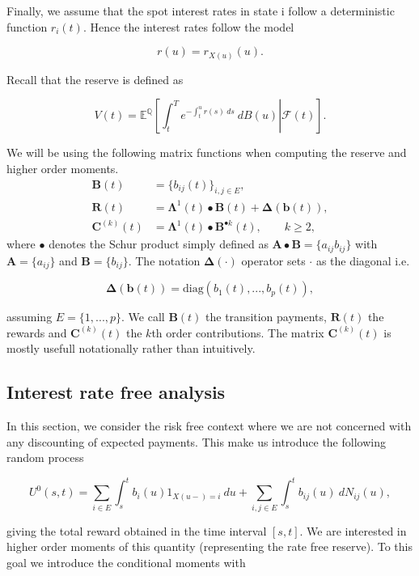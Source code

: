 \documentclass[a4paper,12pt,openany]{book}
\begin{document}
Finally, we assume that the spot interest rates in state i follow a deterministic function \(r_i(t)\). Hence the interest rates follow the model

\[
r(u) = r_{X(u)}(u).
\]

Recall that the reserve is defined as

\[
V(t)=\mathbb E^{\mathbb Q}\left[\left.\int_t^Te^{-\int_t^ur(s)\ ds}\ dB(u)\right\vert \mathcal F(t)\right].
\]

We will be using the following matrix functions when computing the reserve and higher order moments.
\begin{align*}
\mathbf B(t)&=\{b_{ij}(t)\}_{i,j\in E},\\
\mathbf R(t)&=\mathbf \Lambda^1(t)\bullet \mathbf B(t) + \mathbf \Delta (\mathbf b(t)),\\
\mathbf C^{(k)}(t)&=\mathbf \Lambda^1(t)\bullet \mathbf B^{\bullet k}(t),\qquad k\ge 2,
\end{align*}
where \(\bullet\) denotes the Schur product simply defined as \(\mathbf A\bullet\mathbf B=\{a_{ij}b_{ij}\}\) with \(\mathbf A=\{a_{ij}\}\) and \(\mathbf B=\{b_{ij}\}\). The notation \(\mathbf \Delta (\cdot)\) operator sets \(\cdot\) as the diagonal i.e.

\[
\mathbf \Delta (\mathbf b(t))=\text{diag}(b_1(t),...,b_p(t)),
\]

assuming \(E=\{1,...,p\}\). We call \(\mathbf B(t)\) the transition payments, \(\mathbf R(t)\) the rewards and \(\mathbf C^{(k)}(t)\) the \(k\)th order contributions. The matrix \(\mathbf C^{(k)}(t)\) is mostly usefull notationally rather than intuitively.

\hypertarget{interest-rate-free-analysis}{%
\subsection{Interest rate free analysis}\label{interest-rate-free-analysis}}

In this section, we consider the risk free context where we are not concerned with any discounting of expected payments. This make us introduce the following random process

\[
U^0(s,t) = \sum_{i\in E}\int_s^tb_i(u)1_{X(u-)=i}\ du+\sum_{i,j\in E}\int_s^tb_{ij}(u)\ dN_{ij}(u),
\]

giving the total reward obtained in the time interval \([s,t]\). We are interested in higher order moments of this quantity (representing the rate free reserve). To this goal we introduce the conditional moments with
\end{document}

